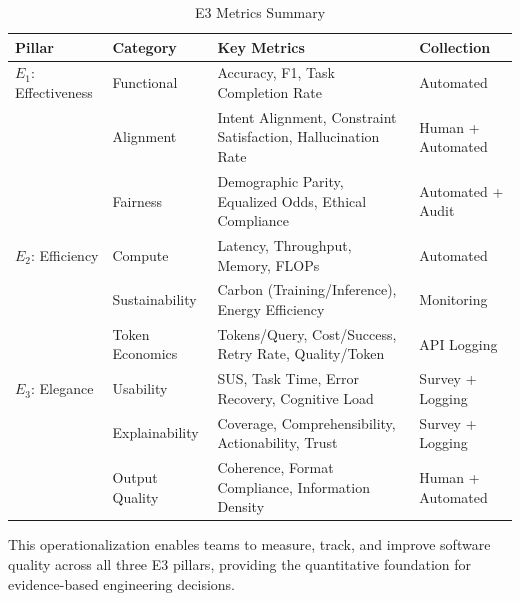 \begin{table}[t]
\centering
\caption{E3 Metrics Summary}
\label{tab:metrics_summary}
\small
\begin{tabularx}{\textwidth}{@{}l l X l@{}}
\toprule
\textbf{Pillar} & \textbf{Category} & \textbf{Key Metrics} & \textbf{Collection} \\
\midrule
$E_1$: Effectiveness & Functional & Accuracy, F1, Task Completion Rate & Automated \\
& Alignment & Intent Alignment, Constraint Satisfaction, Hallucination Rate & Human + Automated \\
& Fairness & Demographic Parity, Equalized Odds, Ethical Compliance & Automated + Audit \\
\addlinespace
$E_2$: Efficiency & Compute & Latency, Throughput, Memory, FLOPs & Automated \\
& Sustainability & Carbon (Training/Inference), Energy Efficiency & Monitoring \\
& Token Economics & Tokens/Query, Cost/Success, Retry Rate, Quality/Token & API Logging \\
\addlinespace
$E_3$: Elegance & Usability & SUS, Task Time, Error Recovery, Cognitive Load & Survey + Logging \\
& Explainability & Coverage, Comprehensibility, Actionability, Trust & Survey + Logging \\
& Output Quality & Coherence, Format Compliance, Information Density & Human + Automated \\
\bottomrule
\end{tabularx}
\end{table}

This operationalization enables teams to measure, track, and improve software quality across all three E3 pillars, providing the quantitative foundation for evidence-based engineering decisions.